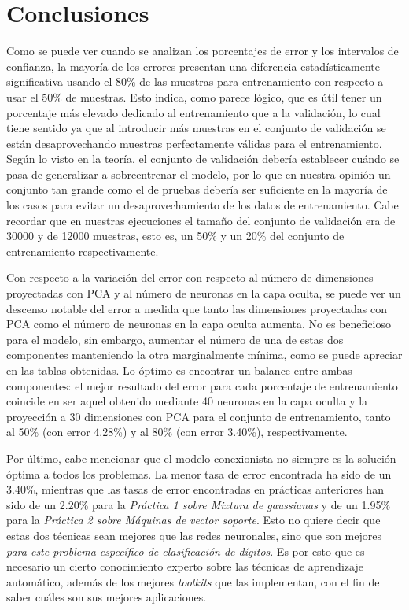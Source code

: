 \documentclass[a4paper]{article}
\begin{document}
\section{Conclusiones}
\quad Como se puede ver cuando se analizan los porcentajes de error y los intervalos de confianza, la mayoría de los errores presentan una diferencia estadísticamente significativa usando el 80\% de las muestras para entrenamiento con respecto a usar el 50\% de muestras. Esto indica, como parece lógico, que es útil tener un porcentaje más elevado dedicado al entrenamiento que a la validación, lo cual tiene sentido ya que al introducir más muestras en el conjunto de validación se están desaprovechando muestras perfectamente válidas para el entrenamiento. Según lo visto en la teoría, el conjunto de validación debería establecer cuándo se pasa de generalizar a sobreentrenar el modelo, por lo que en nuestra opinión un conjunto tan grande como el de pruebas debería ser suficiente en la mayoría de los casos para evitar un desaprovechamiento de los datos de entrenamiento. Cabe recordar que en nuestras ejecuciones el tamaño del conjunto de validación era de 30000 y de 12000 muestras, esto es, un 50\% y un 20\% del conjunto de entrenamiento respectivamente.

\quad Con respecto a la variación del error con respecto al número de dimensiones proyectadas con PCA y al número de neuronas en la capa oculta, se puede ver un descenso notable del error a medida que tanto las dimensiones proyectadas con PCA como el número de neuronas en la capa oculta aumenta. No es beneficioso para el modelo, sin embargo, aumentar el número de una de estas dos componentes manteniendo la otra marginalmente mínima, como se puede apreciar en las tablas obtenidas. Lo óptimo es encontrar un balance entre ambas componentes: el mejor resultado del error para cada porcentaje de entrenamiento coincide en ser aquel obtenido mediante 40 neuronas en la capa oculta y la proyección a 30 dimensiones con PCA para el conjunto de entrenamiento, tanto al 50\% (con error 4.28\%) y al 80\% (con error 3.40\%), respectivamente.

\quad Por último, cabe mencionar que el modelo conexionista no siempre es la solución óptima a todos los problemas. La menor tasa de error encontrada ha sido de un 3.40\%, mientras que las tasas de error encontradas en prácticas anteriores han sido de un 2.20\% para la \textit{Práctica 1 sobre Mixtura de gaussianas} y de un 1.95\% para la \textit{Práctica 2 sobre Máquinas de vector soporte}. Esto no quiere decir que estas dos técnicas sean mejores que las redes neuronales, sino que son mejores \textit{para este problema específico de clasificación de dígitos}. Es por esto que es necesario un cierto conocimiento experto sobre las técnicas de aprendizaje automático, además de los mejores \textit{toolkits} que las implementan, con el fin de saber cuáles son sus mejores aplicaciones.
\end{document}
